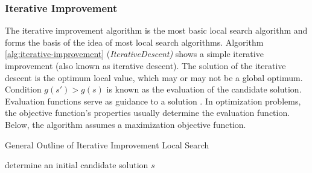 \subsubsection{Iterative Improvement}
The iterative improvement algorithm is the most basic local search algorithm and forms the basis of the idea of most local search algorithms. Algorithm \ref{alg:iterative-improvement} (\textit{IterativeDescent)} shows a simple iterative improvement (also known as iterative descent). The solution of the iterative descent is the optimum local value, which may or may not be a global optimum. Condition $g(s') > g(s)$ is known as the evaluation of the candidate solution. Evaluation functions serve as guidance to a solution \parencite{HolgerH2013StochasticApplications}. In optimization problems, the objective function's properties usually determine the evaluation function. Below, the algorithm assumes a maximization objective function. 

 \begin{algorithm}
  \caption{General Outline of Iterative Improvement Local Search}\label{alg:iterative-improvement}
    determine an initial candidate solution $s$
    
  \end{algorithm}
  
